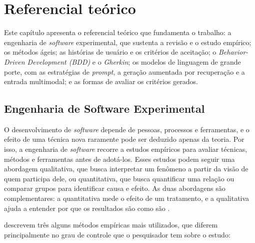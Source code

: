 \chapter[Referencial teórico]{Referencial teórico}
\label{cap:referencial}

Este capítulo apresenta o referencial teórico que fundamenta o trabalho: a engenharia de \textit{software} experimental, que sustenta a revisão e o estudo empírico; os métodos ágeis; as histórias de usuário e os critérios de aceitação; o \textit{Behavior-Driven Development (BDD)} e o \textit{Gherkin}; os modelos de linguagem de grande porte, com as estratégias de \textit{prompt}, a geração aumentada por recuperação e a entrada multimodal; e as formas de avaliar os critérios gerados.

\section{Engenharia de Software Experimental}
\label{sec:es-experimental}

O desenvolvimento de \textit{software} depende de pessoas, processos e ferramentas, e o efeito de uma técnica nova raramente pode ser deduzido apenas da teoria. Por isso, a engenharia de \textit{software} recorre a estudos empíricos para avaliar técnicas, métodos e ferramentas antes de adotá-los. Esses estudos podem seguir uma abordagem qualitativa, que busca interpretar um fenômeno a partir da visão de quem participa dele, ou quantitativa, que busca quantificar uma relação ou comparar grupos para identificar causa e efeito. As duas abordagens são complementares: a quantitativa mede o efeito de um tratamento, e a qualitativa ajuda a entender por que os resultados são como são \cite{wohlin2000}.

 descrevem três alguns métodos empíricas mais utilizados, que diferem principalmente no grau de controle que o pesquisador tem sobre o estudo:


